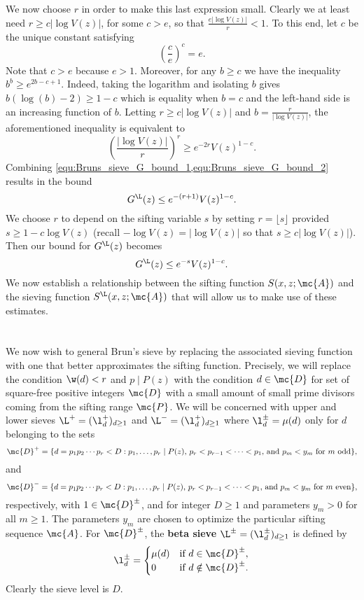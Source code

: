     We now choose $r$ in order to make this last expression small. Clearly we at least need $r \ge c|\log V(z)|$, for some $c > e$, so that $\frac{e|\log V(z)|}{r} < 1$. To this end, let $c$ be the unique constant satisfying
    \[
      \left(\frac{c}{e}\right)^{c} = e.
    \]
    Note that $c > e$ because $e > 1$. Moreover, for any $b \ge c$ we have the inequality $b^{b} \ge e^{2b-c+1}$. Indeed, taking the logarithm and isolating $b$ gives $b(\log(b)-2) \ge 1-c$ which is equality when $b = c$ and the left-hand side is an increasing function of $b$. Letting $r \ge c|\log V(z)|$ and $b = \frac{r}{|\log V(z)|}$, the aforementioned inequality is equivalent to
    \begin{equation}\label{equ:Bruns_sieve_G_bound_2}
      \left(\frac{|\log V(z)|}{r}\right)^{r} \ge e^{-2r}V(z)^{1-c}.
    \end{equation}
    Combining \cref{equ:Bruns_sieve_G_bound_1,equ:Bruns_sieve_G_bound_2} results in the bound
    \[
      G^{\L}(z) \le e^{-(r+1)}V(z)^{1-c}.
    \]
    We choose $r$ to depend on the sifting variable $s$ by setting $r = \lfloor s \rfloor$ provided $s \ge 1-c\log V(z)$ (recall $-\log V(z) = |\log V(z)|$ so that $s \ge c|\log V(z)|$). Then our bound for $G^{\L}(z)$ becomes
    \[
      G^{\L}(z) \le e^{-s}V(z)^{1-c}.
    \]
    We now establish a relationship between the sifting function $S(x,z;\mc{A})$ and the sieving function $S^{\L}(x,z;\mc{A})$ that will allow us to make use of these estimates. 
  \section{}
    We now wish to general Brun's sieve by replacing the associated sieving function with one that better approximates the sifting function. Precisely, we will replace the condition $\w(d) < r$ and $p \mid P(z)$ with the condition $d \in \mc{D}$ for set of square-free positive integers $\mc{D}$ with a small amount of small prime divisors coming from the sifting range $\mc{P}$. We will be concerned with upper and lower sieves $\L^{+} = (\l_{d}^{+})_{d \ge 1}$ and $\L^{-} = (\l_{d}^{+})_{d \ge 1}$ where $\l_{d}^{\pm} = \mu(d)$ only for $d$ belonging to the sets
    \[
      \mc{D}^{+} = \{d = p_{1}p_{2} \cdots p_{r} < D:\text{$p_{1},\ldots,p_{r} \mid P(z)$, $p_{r} < p_{r-1} < \cdots < p_{1}$, and $p_{m} < y_{m}$ for $m$ odd}\},
    \]
    and
    \[
      \mc{D}^{-} = \{d = p_{1}p_{2} \cdots p_{r} < D:\text{$p_{1},\ldots,p_{r} \mid P(z)$, $p_{r} < p_{r-1} < \cdots < p_{1}$, and $p_{m} < y_{m}$ for $m$ even}\},
    \]
    respectively, with $1 \in \mc{D}^{\pm}$, and for integer $D \ge 1$ and parameters $y_{m} > 0$ for all $m \ge 1$. The parameters $y_{m}$ are chosen to optimize the particular sifting sequence $\mc{A}$. For $\mc{D}^{\pm}$, the \textbf{beta sieve} $\L^{\pm} = (\l_{d}^{\pm})_{d \ge 1}$ is defined by
    \[
      \l_{d}^{\pm} = \begin{cases} \mu(d) & \text{if $d \in \mc{D}^{\pm}$}, \\ 0 & \text{if $d \notin \mc{D}^{\pm}$}. \end{cases}
    \]
    Clearly the sieve level is $D$. 
    
